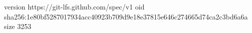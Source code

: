version https://git-lfs.github.com/spec/v1
oid sha256:1e80bf5287017934acc40923b709d9e18e37815e646c274665d74ca2c3bd6a6a
size 3253
